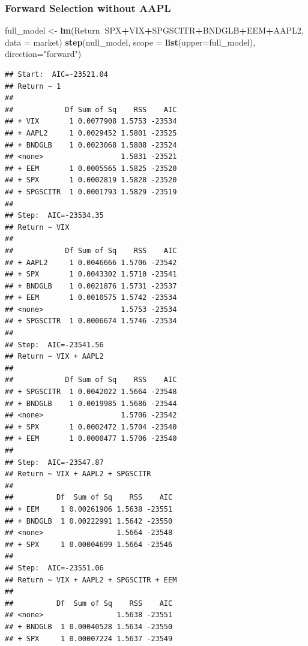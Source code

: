 \documentclass[]{article}
\newenvironment{Shaded}{\begin{snugshade}}{\end{snugshade}}
\newcommand{\KeywordTok}[1]{\textcolor[rgb]{0.13,0.29,0.53}{\textbf{#1}}}
\newcommand{\DataTypeTok}[1]{\textcolor[rgb]{0.13,0.29,0.53}{#1}}
\newcommand{\StringTok}[1]{\textcolor[rgb]{0.31,0.60,0.02}{#1}}
\newcommand{\OperatorTok}[1]{\textcolor[rgb]{0.81,0.36,0.00}{\textbf{#1}}}
\newcommand{\NormalTok}[1]{#1}
\begin{document}
\subsubsection{Forward Selection without
AAPL}\label{forward-selection-without-aapl}

\begin{Shaded}
\begin{Highlighting}[]
\NormalTok{full_model <-}\StringTok{ }\KeywordTok{lm}\NormalTok{(Return}\OperatorTok{~}\NormalTok{SPX}\OperatorTok{+}\NormalTok{VIX}\OperatorTok{+}\NormalTok{SPGSCITR}\OperatorTok{+}\NormalTok{BNDGLB}\OperatorTok{+}\NormalTok{EEM}\OperatorTok{+}\NormalTok{AAPL2, }\DataTypeTok{data =}\NormalTok{ market)}
\KeywordTok{step}\NormalTok{(null_model, }\DataTypeTok{scope =} \KeywordTok{list}\NormalTok{(}\DataTypeTok{upper=}\NormalTok{full_model), }\DataTypeTok{direction=}\StringTok{"forward"}\NormalTok{)}
\end{Highlighting}
\end{Shaded}

\begin{verbatim}
## Start:  AIC=-23521.04
## Return ~ 1
## 
##            Df Sum of Sq    RSS    AIC
## + VIX       1 0.0077908 1.5753 -23534
## + AAPL2     1 0.0029452 1.5801 -23525
## + BNDGLB    1 0.0023068 1.5808 -23524
## <none>                  1.5831 -23521
## + EEM       1 0.0005565 1.5825 -23520
## + SPX       1 0.0002819 1.5828 -23520
## + SPGSCITR  1 0.0001793 1.5829 -23519
## 
## Step:  AIC=-23534.35
## Return ~ VIX
## 
##            Df Sum of Sq    RSS    AIC
## + AAPL2     1 0.0046666 1.5706 -23542
## + SPX       1 0.0043302 1.5710 -23541
## + BNDGLB    1 0.0021876 1.5731 -23537
## + EEM       1 0.0010575 1.5742 -23534
## <none>                  1.5753 -23534
## + SPGSCITR  1 0.0006674 1.5746 -23534
## 
## Step:  AIC=-23541.56
## Return ~ VIX + AAPL2
## 
##            Df Sum of Sq    RSS    AIC
## + SPGSCITR  1 0.0042022 1.5664 -23548
## + BNDGLB    1 0.0019985 1.5686 -23544
## <none>                  1.5706 -23542
## + SPX       1 0.0002472 1.5704 -23540
## + EEM       1 0.0000477 1.5706 -23540
## 
## Step:  AIC=-23547.87
## Return ~ VIX + AAPL2 + SPGSCITR
## 
##          Df  Sum of Sq    RSS    AIC
## + EEM     1 0.00261906 1.5638 -23551
## + BNDGLB  1 0.00222991 1.5642 -23550
## <none>                 1.5664 -23548
## + SPX     1 0.00004699 1.5664 -23546
## 
## Step:  AIC=-23551.06
## Return ~ VIX + AAPL2 + SPGSCITR + EEM
## 
##          Df  Sum of Sq    RSS    AIC
## <none>                 1.5638 -23551
## + BNDGLB  1 0.00040528 1.5634 -23550
## + SPX     1 0.00007224 1.5637 -23549
\end{verbatim}
\end{document}

